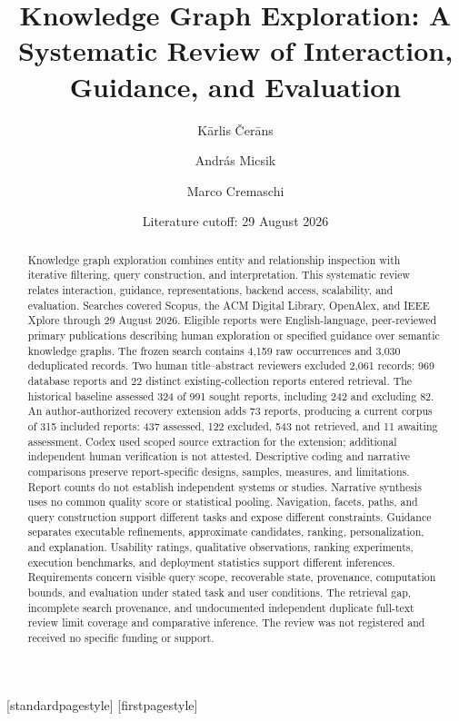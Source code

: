 \documentclass[manuscript,review,screen]{acmart}
\title{Knowledge Graph Exploration: A Systematic Review of Interaction, Guidance, and Evaluation}
\author{K\={a}rlis \v{C}er\={a}ns}
\affiliation{\institution{Institute of Mathematics and Computer Science, University of Latvia}\city{Riga}\country{Latvia}}
\author{Andr\'{a}s Micsik}
\affiliation{\institution{Department of Distributed Systems, HUN-REN SZTAKI}\city{Budapest}\country{Hungary}}
\author{Marco Cremaschi}
\affiliation{\institution{Department of Informatics, Systems and Communication, University of Milano-Bicocca}\city{Milan}\country{Italy}}
\date{Literature cutoff: 29 August 2026}
\begin{document}
\begin{abstract}
Knowledge graph exploration combines entity and relationship inspection with iterative filtering, query construction, and interpretation. This systematic review relates interaction, guidance, representations, backend access, scalability, and evaluation. Searches covered Scopus, the ACM Digital Library, OpenAlex, and IEEE Xplore through 29 August 2026. Eligible reports were English-language, peer-reviewed primary publications describing human exploration or specified guidance over semantic knowledge graphs. The frozen search contains 4,159 raw occurrences and 3,030 deduplicated records. Two human title--abstract reviewers excluded 2,061 records; 969 database reports and 22 distinct existing-collection reports entered retrieval. The historical baseline assessed 324 of 991 sought reports, including 242 and excluding 82. An author-authorized recovery extension adds 73 reports, producing a current corpus of 315 included reports: 437 assessed, 122 excluded, 543 not retrieved, and 11 awaiting assessment. Codex used scoped source extraction for the extension; additional independent human verification is not attested. Descriptive coding and narrative comparisons preserve report-specific designs, samples, measures, and limitations. Report counts do not establish independent systems or studies. Narrative synthesis uses no common quality score or statistical pooling. Navigation, facets, paths, and query construction support different tasks and expose different constraints. Guidance separates executable refinements, approximate candidates, ranking, personalization, and explanation. Usability ratings, qualitative observations, ranking experiments, execution benchmarks, and deployment statistics support different inferences. Requirements concern visible query scope, recoverable state, provenance, computation bounds, and evaluation under stated task and user conditions. The retrieval gap, incomplete search provenance, and undocumented independent duplicate full-text review limit coverage and comparative inference. The review was not registered and received no specific funding or support.
\end{abstract}
\maketitle
[standardpagestyle]{}
[firstpagestyle]{}
\pagestyle{workingdraft}\thispagestyle{workingdraftfirst}
\end{document}
